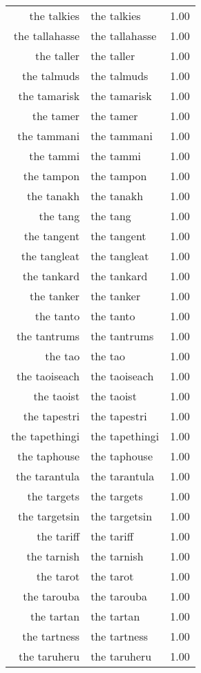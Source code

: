 \begin{table}[ht]
\begin{tabular}{rlr}
  the talkies & the talkies & 1.00 \\ 
  the tallahasse & the tallahasse & 1.00 \\ 
  the taller & the taller & 1.00 \\ 
  the talmuds & the talmuds & 1.00 \\ 
  the tamarisk & the tamarisk & 1.00 \\ 
  the tamer & the tamer & 1.00 \\ 
  the tammani & the tammani & 1.00 \\ 
  the tammi & the tammi & 1.00 \\ 
  the tampon & the tampon & 1.00 \\ 
  the tanakh & the tanakh & 1.00 \\ 
  the tang & the tang & 1.00 \\ 
  the tangent & the tangent & 1.00 \\ 
  the tangleat & the tangleat & 1.00 \\ 
  the tankard & the tankard & 1.00 \\ 
  the tanker & the tanker & 1.00 \\ 
  the tanto & the tanto & 1.00 \\ 
  the tantrums & the tantrums & 1.00 \\ 
  the tao & the tao & 1.00 \\ 
  the taoiseach & the taoiseach & 1.00 \\ 
  the taoist & the taoist & 1.00 \\ 
  the tapestri & the tapestri & 1.00 \\ 
  the tapethingi & the tapethingi & 1.00 \\ 
  the taphouse & the taphouse & 1.00 \\ 
  the tarantula & the tarantula & 1.00 \\ 
  the targets & the targets & 1.00 \\ 
  the targetsin & the targetsin & 1.00 \\ 
  the tariff & the tariff & 1.00 \\ 
  the tarnish & the tarnish & 1.00 \\ 
  the tarot & the tarot & 1.00 \\ 
  the tarouba & the tarouba & 1.00 \\ 
  the tartan & the tartan & 1.00 \\ 
  the tartness & the tartness & 1.00 \\ 
  the taruheru & the taruheru & 1.00 \\ 

\end{tabular}
\end{table}
